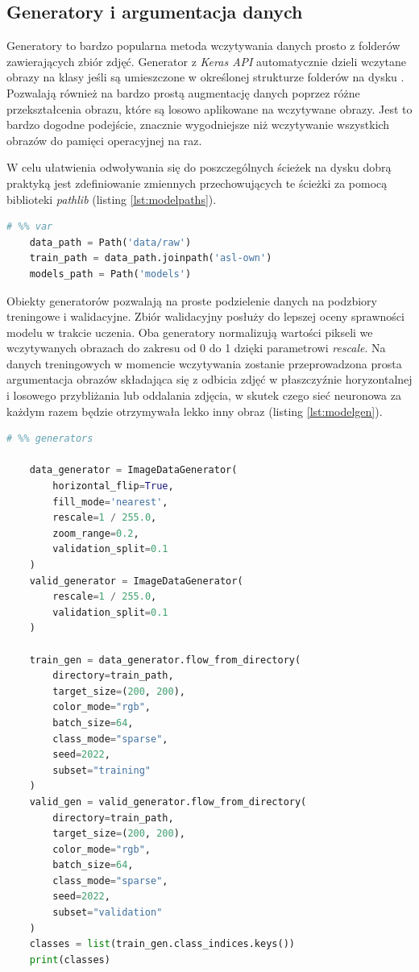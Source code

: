 \documentclass[a4paper,12pt,oneside]{book} %
\begin{document}
\subsection{Generatory i argumentacja danych}
Generatory to bardzo popularna metoda wczytywania danych prosto z folderów zawierających zbiór zdjęć. Generator z \emph{Keras API} automatycznie dzieli wczytane obrazy na klasy jeśli są umieszczone w określonej strukturze folderów na dysku \cite{idg}. Pozwalają również na bardzo prostą augmentację danych poprzez różne przekształcenia obrazu, które są losowo aplikowane na wczytywane obrazy. Jest to bardzo dogodne podejście, znacznie wygodniejsze niż wczytywanie wszystkich obrazów do pamięci operacyjnej na raz.

W celu ułatwienia odwoływania się do poszczególnych ścieżek na dysku dobrą praktyką jest zdefiniowanie zmiennych przechowujących te ścieżki za pomocą biblioteki \emph{pathlib} (listing \ref{lst:modelpaths}).

\begin{lstlisting}[language=Python, caption={Definicja ścieżek do danych i modeli}, label={lst:modelpaths}]
	# %% var
	data_path = Path('data/raw')
	train_path = data_path.joinpath('asl-own')
	models_path = Path('models')
\end{lstlisting}

Obiekty generatorów pozwalają na proste podzielenie danych na podzbiory treningowe i walidacyjne. Zbiór walidacyjny posłuży do lepszej oceny sprawności modelu w trakcie uczenia. Oba generatory normalizują wartości pikseli we wczytywanych obrazach do zakresu od 0 do 1 dzięki parametrowi \emph{rescale}. Na danych treningowych w momencie wczytywania zostanie przeprowadzona prosta argumentacja obrazów składająca się z odbicia zdjęć w płaszczyźnie horyzontalnej i losowego przybliżania lub oddalania zdjęcia, w skutek czego sieć neuronowa za każdym razem będzie otrzymywała lekko inny obraz (listing \ref{lst:modelgen}).

\begin{lstlisting}[language=Python, caption={Definicja generatorów}, label={lst:modelgen}]
	# %% generators
	
	data_generator = ImageDataGenerator(
		horizontal_flip=True,
		fill_mode='nearest',
		rescale=1 / 255.0,
		zoom_range=0.2,
		validation_split=0.1
	)
	valid_generator = ImageDataGenerator(
		rescale=1 / 255.0,
		validation_split=0.1
	)
	
	train_gen = data_generator.flow_from_directory(
		directory=train_path,
		target_size=(200, 200),
		color_mode="rgb",
		batch_size=64,
		class_mode="sparse",
		seed=2022,
		subset="training"
	)
	valid_gen = valid_generator.flow_from_directory(
		directory=train_path,
		target_size=(200, 200),
		color_mode="rgb",
		batch_size=64,
		class_mode="sparse",
		seed=2022,
		subset="validation"
	)
	classes = list(train_gen.class_indices.keys())
	print(classes)
	
\end{lstlisting}
\end{document}

